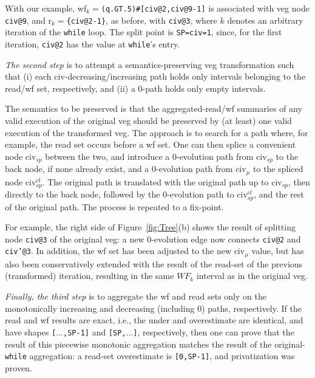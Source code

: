 \documentclass[10pt,nocopyrightspace]{sigplanconf}
\begin{document}
With our example, {\sc wf}$_k=${\tt (q.GT.5)\#[civ@2,civ@9-1]}
is associated with {\sc veg} node {\tt civ@9}, and 
{\sc r}$_k=${\tt \{civ@2-1\}}, as before, with {\tt civ@3}, 
where $k$ denotes an arbitrary iteration of the {\tt while} loop.
The split point is {\tt SP=civ=1}, since, for the first iteration, 
{\tt civ@2} has the value at {\tt while}'s entry. 

{\em The second step} is to attempt a semantics-preserving {\sc veg} transformation
such that (i) each {\sc civ}-decreasing/increasing path holds only intervals 
belonging to the read/{\sc wf} set, respectively, and (ii) a $0$-path holds
only empty intervals.

The semantics to be preserved is that the aggregated-read/{\sc wf} summaries of
any valid execution of the original {\sc veg} should be preserved by (at least) 
one valid execution of the transformed {\sc veg}.  The approach is
to search for a path where, for example,  the read set occurs before a {\sc wf} set.
One can then splice a convenient node {\sc civ}$_{sp}$ between the two, and 
introduce a $0$-evolution path from {\sc civ}$_{sp}$ to the back node, 
if none already exist,
and a $0$-evolution path from {\sc civ}$_\mu$ to the spliced node {\sc civ}$_{sp}^{cl}$.
The original path is translated with the original path up to {\sc civ}$_{sp}$,
then directly to the back node, followed by the $0$-evolution path to  
{\sc civ}$_{sp}^{cl}$, and the rest of the original path. The process is
repeated to a fix-point.

For example, the right side of Figure~\ref{fig:Tree}(b) shows the result of
splitting  node {\tt civ@3} of the original {\sc veg}: a new $0$-evolution
edge now connects {\tt civ@2} and {\tt civ'@3}. In addition, the {\sc wf} set 
has been adjusted to the new {\sc civ}$_\mu$ value, but has also
been conservatively extended with the result of the read-set of the previous
(transformed) iteration, resulting in the same $WF_k$ interval as 
in the original {\sc veg}. 



{\em Finally, the third step} is to aggregate the {\sc wf} and read sets 
only on the monotonically increasing and decreasing (including $0$) paths,
respectively. 
If the read and {\sc wf} results are exact, i.e., the under 
and overestimate are identical, and have shapes {\tt[$\ldots$,SP-1]}  
and {\tt[SP,$\ldots$]}, respectively, then 
one can prove that the result of this piecewise monotonic
aggregation matches the result of the original-{\tt while} aggregation:
a read-set overestimate is {\tt [0,SP-1]}, and privatization was proven.
\end{document}
